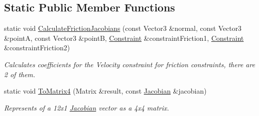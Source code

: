 \subsection*{Static Public Member Functions}
\begin{DoxyCompactItemize}
\item 
static void \hyperlink{classConstraint_ad59276ed90da13e5169f411a0b51329d}{Calculate\+Friction\+Jacobians} (const Vector3 \&normal, const Vector3 \&pointA, const Vector3 \&pointB, \hyperlink{classConstraint}{Constraint} \&constraint\+Friction1, \hyperlink{classConstraint}{Constraint} \&constraint\+Friction2)
\begin{DoxyCompactList}\small\item\em Calculates coefficients for the Velocity constraint for friction constraints, there are 2 of them. \end{DoxyCompactList}\item 
static void \hyperlink{classConstraint_ae458b57a23e5c4f49654ac8fbb37b3e8}{To\+Matrix4} (Matrix \&result, const \hyperlink{classJacobian}{Jacobian} \&jacobian)
\begin{DoxyCompactList}\small\item\em Represents of a 12x1 \hyperlink{classJacobian}{Jacobian} vector as a 4x4 matrix. \end{DoxyCompactList}\end{DoxyCompactItemize}
